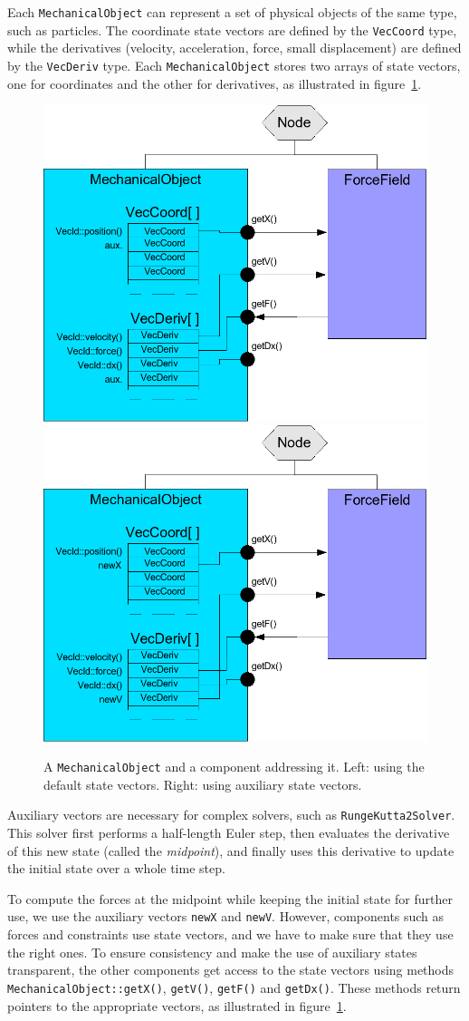 Each \texttt{MechanicalObject} can represent a set of physical objects of the same type, such as particles.
The coordinate state vectors are defined by the \texttt{VecCoord} type, while the derivatives (velocity, acceleration, force, small displacement) are defined by the \texttt{VecDeriv} type.
Each \texttt{MechanicalObject} stores two arrays of state vectors, one for coordinates and the other for derivatives, as illustrated in figure~\ref{fig:mechanicalobject}.
\begin{figure}
 \centering
 \includegraphics[width=0.45\linewidth]{MechanicalObject1}
\includegraphics[width=0.45\linewidth]{MechanicalObject2}
  \caption{A \texttt{MechanicalObject} and a component addressing it. Left: using the default state vectors. Right: using auxiliary state vectors.}
 \label{fig:mechanicalobject}
\end{figure}

Auxiliary vectors are necessary for complex solvers, such as \texttt{RungeKutta2Solver}. 
This solver first performs a half-length Euler step, then evaluates the derivative of this new state (called the \emph{midpoint}), and finally uses this derivative to update the initial state over a whole time step.

To compute the forces at the midpoint while keeping the initial state for further use, we use the auxiliary vectors \texttt{newX} and \texttt{newV}.
However, components such as forces and constraints use state vectors, and we have to make sure that they use the right ones.
To ensure consistency and make the use of auxiliary states transparent, the other components get access to the state vectors using methods \texttt{MechanicalObject::getX()}, \texttt{getV()}, \texttt{getF()} and  \texttt{getDx()}.
These methods return pointers to the appropriate vectors, as illustrated in figure~\ref{fig:mechanicalobject}.

